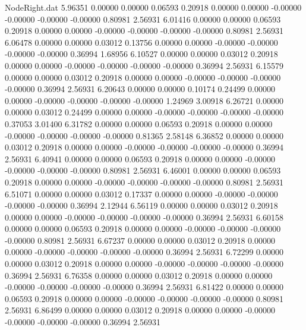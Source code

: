 \begin{filecontents}{NodeRight.dat}
   5.96351    0.00000    0.00000     0.06593    0.20918    0.00000    0.00000   -0.00000   -0.00000   -0.00000   -0.00000    0.80981    2.56931
   6.01416    0.00000    0.00000     0.06593    0.20918    0.00000    0.00000   -0.00000   -0.00000   -0.00000   -0.00000    0.80981    2.56931
   6.06478    0.00000    0.00000     0.03012    0.13756    0.00000    0.00000   -0.00000   -0.00000   -0.00000   -0.00000    0.36994    1.68956
   6.10527    0.00000    0.00000     0.03012    0.20918    0.00000    0.00000   -0.00000   -0.00000   -0.00000   -0.00000    0.36994    2.56931
   6.15579    0.00000    0.00000     0.03012    0.20918    0.00000    0.00000   -0.00000   -0.00000   -0.00000   -0.00000    0.36994    2.56931
   6.20643    0.00000    0.00000     0.10174    0.24499    0.00000    0.00000   -0.00000   -0.00000   -0.00000   -0.00000    1.24969    3.00918
   6.26721    0.00000    0.00000     0.03012    0.24499    0.00000    0.00000   -0.00000   -0.00000   -0.00000   -0.00000    0.37053    3.01400
   6.31782    0.00000    0.00000     0.06593    0.20918    0.00000    0.00000   -0.00000   -0.00000   -0.00000   -0.00000    0.81365    2.58148
   6.36852    0.00000    0.00000     0.03012    0.20918    0.00000    0.00000   -0.00000   -0.00000   -0.00000   -0.00000    0.36994    2.56931
   6.40941    0.00000    0.00000     0.06593    0.20918    0.00000    0.00000   -0.00000   -0.00000   -0.00000   -0.00000    0.80981    2.56931
   6.46001    0.00000    0.00000     0.06593    0.20918    0.00000    0.00000   -0.00000   -0.00000   -0.00000   -0.00000    0.80981    2.56931
   6.51071    0.00000    0.00000     0.03012    0.17337    0.00000    0.00000   -0.00000   -0.00000   -0.00000   -0.00000    0.36994    2.12944
   6.56119    0.00000    0.00000     0.03012    0.20918    0.00000    0.00000   -0.00000   -0.00000   -0.00000   -0.00000    0.36994    2.56931
   6.60158    0.00000    0.00000     0.06593    0.20918    0.00000    0.00000   -0.00000   -0.00000   -0.00000   -0.00000    0.80981    2.56931
   6.67237    0.00000    0.00000     0.03012    0.20918    0.00000    0.00000   -0.00000   -0.00000   -0.00000   -0.00000    0.36994    2.56931
   6.72299    0.00000    0.00000     0.03012    0.20918    0.00000    0.00000   -0.00000   -0.00000   -0.00000   -0.00000    0.36994    2.56931
   6.76358    0.00000    0.00000     0.03012    0.20918    0.00000    0.00000   -0.00000   -0.00000   -0.00000   -0.00000    0.36994    2.56931
   6.81422    0.00000    0.00000     0.06593    0.20918    0.00000    0.00000   -0.00000   -0.00000   -0.00000   -0.00000    0.80981    2.56931
   6.86499    0.00000    0.00000     0.03012    0.20918    0.00000    0.00000   -0.00000   -0.00000   -0.00000   -0.00000    0.36994    2.56931

\end{filecontents}
